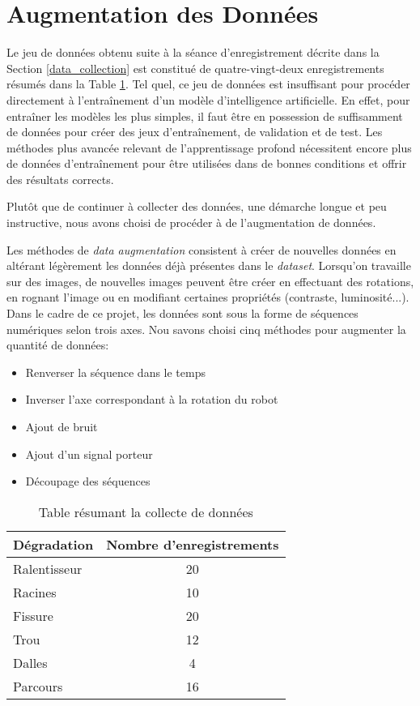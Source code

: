 \section{Augmentation des Données}
Le jeu de données obtenu suite à la séance d'enregistrement décrite dans la Section \ref{data_collection} est constitué de quatre-vingt-deux enregistrements résumés dans la Table \ref{data_collection_table}. Tel quel, ce jeu de données est insuffisant pour procéder directement à l'entraînement d'un modèle d'intelligence artificielle. En effet, pour entraîner les modèles les plus simples, il faut être en possession de suffisamment de données pour créer des jeux d'entraînement, de validation et de test. Les méthodes plus avancée relevant de l'apprentissage profond nécessitent encore plus de données d'entraînement pour être utilisées dans de bonnes conditions et offrir des résultats corrects.

Plutôt que de continuer à collecter des données, une démarche longue et peu instructive, nous avons choisi de procéder à de l'augmentation de données.

Les méthodes de \textit{data augmentation} consistent à créer de nouvelles données en altérant légèrement les données déjà présentes dans le \textit{dataset}. Lorsqu'on travaille sur des images, de nouvelles images peuvent être créer en effectuant des rotations, en rognant l'image ou en modifiant certaines propriétés (contraste, luminosité...).\\
Dans le cadre de ce projet, les données sont sous la forme de séquences numériques selon trois axes. Nou savons choisi cinq méthodes pour augmenter la quantité de données:
\begin{itemize}
    \item Renverser la séquence dans le temps
    \item Inverser l'axe correspondant à la rotation du robot
    \item Ajout de bruit
    \item Ajout d'un signal porteur
    \item Découpage des séquences
\end{itemize}

\begin{table}[]
    \begin{tabular}{|l|c|}
    \hline
    Dégradation  & \multicolumn{1}{l|}{Nombre d'enregistrements} \\ \hline
    Ralentisseur & 20                                            \\ \hline
    Racines      & 10                                            \\ \hline
    Fissure      & 20                                            \\ \hline
    Trou         & 12                                            \\ \hline
    Dalles       & 4                                             \\ \hline
    Parcours     & 16                                            \\ \hline
    \end{tabular}
    \caption{Table résumant la collecte de données}
    \label{data_collection_table}
\end{table}